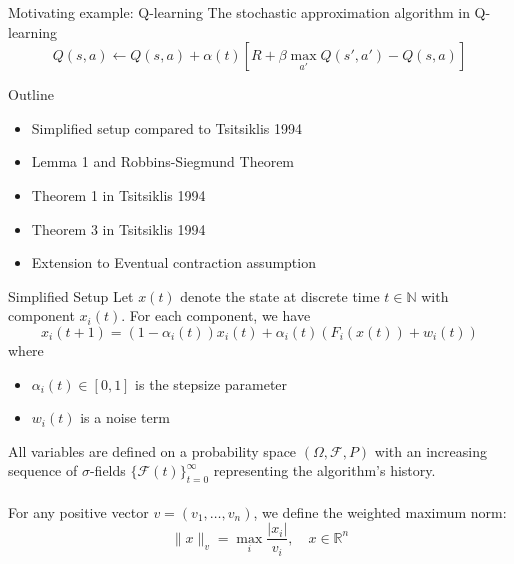 \documentclass[aspectratio=169]{beamer} %
\begin{document}
\begin{frame}{Motivating example: Q-learning}
The stochastic approximation algorithm in Q-learning
$$
Q(s,a) \leftarrow Q(s,a) + \alpha(t) \left[R + \beta \max_{a'} Q(s',a')- Q(s,a)\right]
$$
    
\end{frame}
\begin{frame}{Outline}
\begin{itemize}
    \item Simplified setup compared to Tsitsiklis 1994
    \item Lemma 1 and Robbins-Siegmund Theorem
    \item Theorem 1 in Tsitsiklis 1994
    \item Theorem 3 in Tsitsiklis 1994
    \item Extension to Eventual contraction assumption
\end{itemize}
\end{frame}
\begin{frame}{Simplified Setup}
Let $x(t)$ denote the state at discrete time $t\in\mathbb{N}$ with component $x_i(t)$. For each component, we have
$$
x_i(t+1) = (1-\alpha_i(t))x_i(t) + \alpha_i(t)(F_i(x(t)) + w_i(t)) 
$$
where
\begin{itemize}
    \item $\alpha_i(t) \in [0,1]$ is the stepsize parameter
    \item $w_i(t)$ is a noise term
\end{itemize}
All variables are defined on a probability space $(\Omega, \mathcal{F}, P)$ with an increasing sequence of $\sigma$-fields $\{\mathcal{F}(t)\}_{t=0}^{\infty}$ representing the algorithm's history. \\
\\
For any positive vector $v = (v_1, \ldots, v_n)$, we define the weighted maximum norm:
\begin{equation}\label{eq:weighted norm}
\|x\|_v = \max_i \frac{|x_i|}{v_i}, \quad x \in \mathbb{R}^n
\end{equation}
    
\end{frame}
\end{document}
